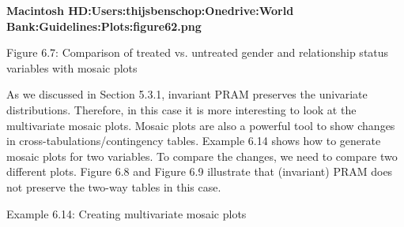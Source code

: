 \documentclass[letterpaper,10pt,english]{sphinxmanual}
\begin{document}
{\color{red}\bfseries{}\textbar{}Macintosh HD:Users:thijsbenschop:Onedrive:World
Bank:Guidelines:Plots:figure62.png\textbar{}}

Figure 6.7: Comparison of treated vs. untreated gender and relationship
status variables with mosaic plots

As we discussed in Section 5.3.1, invariant PRAM preserves the
univariate distributions. Therefore, in this case it is more interesting
to look at the multivariate mosaic plots. Mosaic plots are also a
powerful tool to show changes in cross-tabulations/contingency tables.
Example 6.14 shows how to generate mosaic plots for two variables. To
compare the changes, we need to compare two different plots. Figure 6.8
and Figure 6.9 illustrate that (invariant) PRAM does not preserve the
two-way tables in this case.

Example 6.14: Creating multivariate mosaic plots
\end{document}
